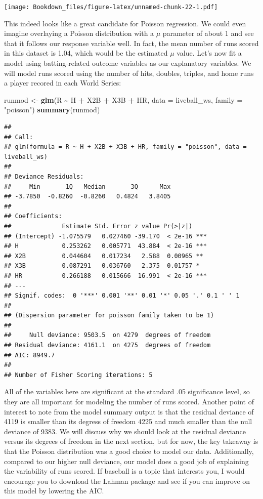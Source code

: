 \documentclass[
]{book}
\newenvironment{Shaded}{\begin{snugshade}}{\end{snugshade}}
\newcommand{\DataTypeTok}[1]{\textcolor[rgb]{0.13,0.29,0.53}{#1}}
\newcommand{\KeywordTok}[1]{\textcolor[rgb]{0.13,0.29,0.53}{\textbf{#1}}}
\newcommand{\NormalTok}[1]{#1}
\newcommand{\OperatorTok}[1]{\textcolor[rgb]{0.81,0.36,0.00}{\textbf{#1}}}
\newcommand{\StringTok}[1]{\textcolor[rgb]{0.31,0.60,0.02}{#1}}
\begin{document}
\texttt{[image: Bookdown\_files/figure-latex/unnamed-chunk-22-1.pdf]}

This indeed looks like a great candidate for Poisson regression. We could even imagine overlaying a Poisson distribution with a \(\mu\) parameter of about 1 and see that it follows our response variable well. In fact, the mean number of runs scored in this dataset is 1.04, which would be the estimated \(\mu\) value. Let's now fit a model using batting-related outcome variables as our explanatory variables. We will model runs scored using the number of hits, doubles, triples, and home runs a player recored in each World Series:

\begin{Shaded}
\begin{Highlighting}[]
\NormalTok{runmod \textless{}{-}}\StringTok{ }\KeywordTok{glm}\NormalTok{(R }\OperatorTok{\textasciitilde{}}\StringTok{ }\NormalTok{H }\OperatorTok{+}\StringTok{ }\NormalTok{X2B }\OperatorTok{+}\StringTok{ }\NormalTok{X3B }\OperatorTok{+}\StringTok{ }\NormalTok{HR, }\DataTypeTok{data =}\NormalTok{ liveball\_ws, }\DataTypeTok{family =} \StringTok{"poisson"}\NormalTok{)}
\KeywordTok{summary}\NormalTok{(runmod)}
\end{Highlighting}
\end{Shaded}

\begin{verbatim}
## 
## Call:
## glm(formula = R ~ H + X2B + X3B + HR, family = "poisson", data = liveball_ws)
## 
## Deviance Residuals: 
##     Min       1Q   Median       3Q      Max  
## -3.7850  -0.8260  -0.8260   0.4824   3.8405  
## 
## Coefficients:
##              Estimate Std. Error z value Pr(>|z|)    
## (Intercept) -1.075579   0.027460 -39.170  < 2e-16 ***
## H            0.253262   0.005771  43.884  < 2e-16 ***
## X2B          0.044604   0.017234   2.588  0.00965 ** 
## X3B          0.087291   0.036760   2.375  0.01757 *  
## HR           0.266188   0.015666  16.991  < 2e-16 ***
## ---
## Signif. codes:  0 '***' 0.001 '**' 0.01 '*' 0.05 '.' 0.1 ' ' 1
## 
## (Dispersion parameter for poisson family taken to be 1)
## 
##     Null deviance: 9503.5  on 4279  degrees of freedom
## Residual deviance: 4161.1  on 4275  degrees of freedom
## AIC: 8949.7
## 
## Number of Fisher Scoring iterations: 5
\end{verbatim}

All of the variables here are significant at the standard .05 significance level, so they are all important for modeling the number of runs scored. Another point of interest to note from the model summary output is that the residual deviance of 4119 is smaller than its degress of freedom 4225 and much smaller than the null deviance of 9383. We will discuss why we should look at the residual deviance versus its degrees of freedom in the next section, but for now, the key takeaway is that the Poisson distribution was a good choice to model our data. Additionally, compared to our higher null deviance, our model does a good job of explaining the variability of runs scored. If baseball is a topic that interests you, I would encourage you to download the Lahman package and see if you can improve on this model by lowering the AIC.
\end{document}
